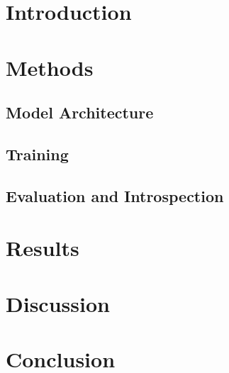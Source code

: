 \documentclass[conference]{IEEEtran}
\begin{document}
\section{Introduction}


\section{Methods}


\subsection{Model Architecture}


\subsection{Training}


\subsection{Evaluation and Introspection}


\section{Results}


\section{Discussion}


\section{Conclusion}


\break{}

\end{document}
